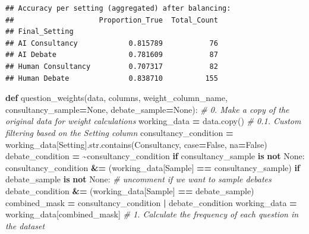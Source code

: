 \documentclass[
]{article}
\newenvironment{Shaded}{\begin{snugshade}}{\end{snugshade}}
\newcommand{\BuiltInTok}[1]{#1}
\newcommand{\CommentTok}[1]{\textcolor[rgb]{0.56,0.35,0.01}{\textit{#1}}}
\newcommand{\ControlFlowTok}[1]{\textcolor[rgb]{0.13,0.29,0.53}{\textbf{#1}}}
\newcommand{\KeywordTok}[1]{\textcolor[rgb]{0.13,0.29,0.53}{\textbf{#1}}}
\newcommand{\NormalTok}[1]{#1}
\newcommand{\OperatorTok}[1]{\textcolor[rgb]{0.81,0.36,0.00}{\textbf{#1}}}
\newcommand{\StringTok}[1]{\textcolor[rgb]{0.31,0.60,0.02}{#1}}
\newcommand{\VariableTok}[1]{\textcolor[rgb]{0.00,0.00,0.00}{#1}}
\begin{document}
\begin{verbatim}
## Accuracy per setting (aggregated) after balancing:
##                    Proportion_True  Total_Count
## Final_Setting                                  
## AI Consultancy            0.815789           76
## AI Debate                 0.781609           87
## Human Consultancy         0.707317           82
## Human Debate              0.838710          155
\end{verbatim}

\begin{Shaded}
\begin{Highlighting}[]


\KeywordTok{def}\NormalTok{ question\_weights(data, columns, weight\_column\_name, consultancy\_sample}\OperatorTok{=}\VariableTok{None}\NormalTok{, debate\_sample}\OperatorTok{=}\VariableTok{None}\NormalTok{):}
    \CommentTok{\# 0. Make a copy of the original data for weight calculations}
\NormalTok{    working\_data }\OperatorTok{=}\NormalTok{ data.copy()}
    \CommentTok{\# 0.1. Custom filtering based on the \textquotesingle{}Setting\textquotesingle{} column}
\NormalTok{    consultancy\_condition }\OperatorTok{=}\NormalTok{ working\_data[}\StringTok{\textquotesingle{}Setting\textquotesingle{}}\NormalTok{].}\BuiltInTok{str}\NormalTok{.contains(}\StringTok{\textquotesingle{}Consultancy\textquotesingle{}}\NormalTok{, case}\OperatorTok{=}\VariableTok{False}\NormalTok{, na}\OperatorTok{=}\VariableTok{False}\NormalTok{)}
\NormalTok{    debate\_condition }\OperatorTok{=} \OperatorTok{\textasciitilde{}}\NormalTok{consultancy\_condition}
    \ControlFlowTok{if}\NormalTok{ consultancy\_sample }\KeywordTok{is} \KeywordTok{not} \VariableTok{None}\NormalTok{:}
\NormalTok{        consultancy\_condition }\OperatorTok{\&=}\NormalTok{ (working\_data[}\StringTok{\textquotesingle{}Sample\textquotesingle{}}\NormalTok{] }\OperatorTok{==}\NormalTok{ consultancy\_sample)}
    \ControlFlowTok{if}\NormalTok{ debate\_sample }\KeywordTok{is} \KeywordTok{not} \VariableTok{None}\NormalTok{: }\CommentTok{\# uncomment if we want to sample debates}
\NormalTok{        debate\_condition }\OperatorTok{\&=}\NormalTok{ (working\_data[}\StringTok{\textquotesingle{}Sample\textquotesingle{}}\NormalTok{] }\OperatorTok{==}\NormalTok{ debate\_sample)}
\NormalTok{    combined\_mask }\OperatorTok{=}\NormalTok{ consultancy\_condition }\OperatorTok{|}\NormalTok{ debate\_condition}
\NormalTok{    working\_data }\OperatorTok{=}\NormalTok{ working\_data[combined\_mask]}
    \CommentTok{\# 1. Calculate the frequency of each question in the dataset}

\end{Highlighting}
\end{Shaded}
\end{document}
